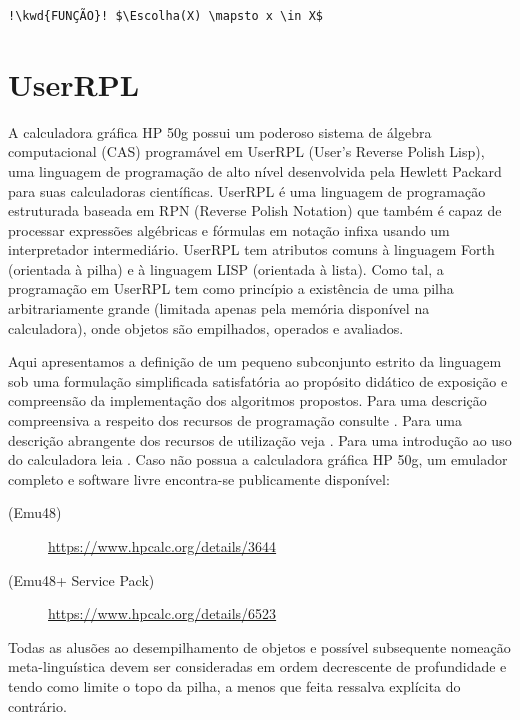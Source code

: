\documentclass[12pt,a4paper]{report}
\newcommand{\kwd}[1]{\texttt{\textcolor{keyword}{#1}}}
\numberwithin{theorem}{chapter}
\DeclareMathOperator{\Escolha}{Escolha}
\begin{document}
\begin{lstlisting}[language=algorithm]
  !\kwd{FUNÇÃO}! $\Escolha(X) \mapsto x \in X$
\end{lstlisting}




\chapter{UserRPL}

A calculadora gráfica HP 50g possui um poderoso sistema de álgebra
computacional (CAS) programável em UserRPL (User's Reverse Polish
Lisp), uma linguagem de programação de alto nível desenvolvida pela
Hewlett Packard para suas calculadoras científicas.  UserRPL é uma
linguagem de programação estruturada baseada em RPN (Reverse Polish
Notation) que também é capaz de processar expressões algébricas e
fórmulas em notação infixa usando um interpretador intermediário.
UserRPL tem atributos comuns à linguagem Forth (orientada à pilha) e à
linguagem LISP (orientada à lista).  Como tal, a programação em
UserRPL tem como princípio a existência de uma pilha arbitrariamente
grande (limitada apenas pela memória disponível na calculadora), onde
objetos são empilhados, operados e avaliados.

Aqui apresentamos a definição de um pequeno subconjunto estrito da
linguagem sob uma formulação simplificada satisfatória ao propósito
didático de exposição e compreensão da implementação dos algoritmos
propostos.  Para uma descrição compreensiva a respeito dos recursos de
programação consulte \cite{HP50G_AUR}.  Para uma descrição abrangente
dos recursos de utilização veja \cite{HP50G_UM}.  Para uma introdução
ao uso do calculadora leia \cite{HP50G_UG}.  Caso não possua a
calculadora gráfica HP 50g, um emulador completo e software livre
encontra-se publicamente disponível:
\begin{description}
\item[(Emu48)] \url{https://www.hpcalc.org/details/3644}
\item[(Emu48+ Service Pack)] \url{https://www.hpcalc.org/details/6523}
\end{description}

Todas as alusões ao desempilhamento de objetos e possível subsequente
nomeação meta-linguística devem ser consideradas em ordem decrescente
de profundidade e tendo como limite o topo da pilha, a menos que feita
ressalva explícita do contrário.
\end{document}
